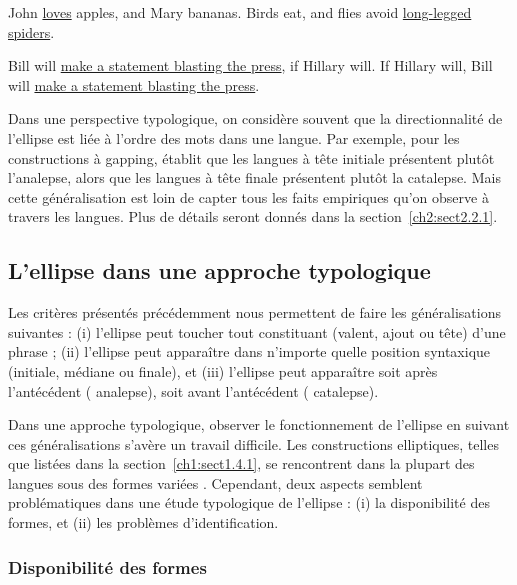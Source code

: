 \ea
\ea  John \uline{loves} apples, and Mary bananas. \label{ch1:ex91a} 
\ex  Birds eat, and flies avoid \uline{long-legged spiders}. \label{ch1:ex91b} 
\z
\z

\ea \label{ch1:ex92}
\ea  Bill will \uline{make a statement blasting the press}, if Hillary will. 
\ex  If Hillary will, Bill will \uline{make a statement blasting the press}.  
\z
\z

Dans une perspective typologique, on considère souvent que la directionnalité de l’ellipse est liée à l’ordre des mots dans une langue. Par exemple, pour les constructions à gapping, \citet{Ross1970} établit que les langues à tête initiale présentent plutôt l’analepse, alors que les langues à tête finale présentent plutôt la catalepse. Mais cette généralisation est loin de capter tous les faits empiriques qu’on observe à travers les langues. Plus de détails seront donnés dans la section~\ref{ch2:sect2.2.1}.


\subsection{L’ellipse dans une approche typologique} \label{ch1:sect1.4.4}

Les critères présentés précédemment nous permettent de faire les généralisations suivantes : (i) l’ellipse peut toucher tout constituant (valent, ajout ou tête) d’une phrase ; (ii) l’ellipse peut apparaître dans n’importe quelle position syntaxique (initiale, médiane ou finale), et (iii) l’ellipse peut apparaître soit après l’antécédent ({\cad} analepse), soit avant l’antécédent ({\cad} catalepse).

Dans une approche typologique, observer le fonctionnement de l’ellipse en suivant ces généralisations s’avère un travail difficile. Les constructions elliptiques, telles que listées dans la section~\ref{ch1:sect1.4.1}, se rencontrent dans la plupart des langues sous des formes variées \citep{Sanders1977,Harries-Delisle1978,MallinsonEtAl1981,Haspelmath2007}. Cependant, deux aspects semblent problématiques dans une étude typologique de l’ellipse : (i) la disponibilité des formes, et (ii) les problèmes d’identification. 


\subsubsection{Disponibilité des formes} \label{ch1:sect1.4.4.1}

